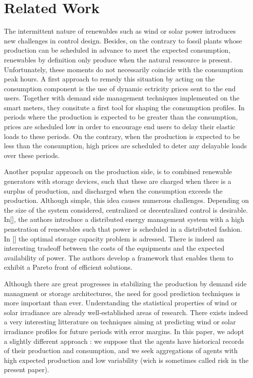 \documentclass[conference]{IEEEtran}
\begin{document}
\section{Related Work}
\label{sec:related}

The intermittent nature of renewables such as wind or solar power introduces new challenges in control design. Besides, on the contrary to fossil plants whose production can be scheduled in advance to meet the expected consumption, renewables by definition only produce when the natural ressource is present. Unfortunately, these moments do not necessarily coincide with the consumption peak hours. A first approach to remedy this situation by acting on the consumption component is the use of dynamic ectricity prices sent to the end users. Together with demand side management techniques implemented on the smart meters, they consitute a first tool for shaping the consumption profiles. In periods where the production is expected to be greater than the consumption, prices are scheduled low in order to encourage end users to delay their elastic loads to these periods. On the contrary, when the production is expected to be less than the consumption, high prices are scheduled to deter any delayable loads over these periods.

Another popular approach on the production side, is to combined renewable generators with storage devices, such that these are charged when there is a surplus of production, and discharged when the consumption exceeds the production. Although simple, this idea causes numerous challenges. Depending on the size of the system considered, centralized or decentralized control is desirable. In[], the authors introduce a distributed energy management system with a high penetration of renewables such that power is scheduled in a distributed fashion. In [] the optimal storage capacity problem is adressed. There is indeed an interesting tradeoff between the costs of the equipments and the expected availability of power. The authors develop a framework that enables them to exhibit a Pareto front of efficient solutions.

Although there are great progresses in stabilizing the production by demand side managment or storage architectures, the need for good prediction techniques is more important than ever. Understanding the statistical properties of wind or solar irradiance are already well-established areas of research. There exists indeed a very interesting litterature on techniques aiming at predicting wind or solar irradiance profiles for future periods with error margins. In this paper, we adopt a slightly different approach : we suppose that the agents have historical records of their production and consumption, and we seek aggregations of agents with high expected production and low variability (wich is sometimes called risk in the present paper).
\end{document}
